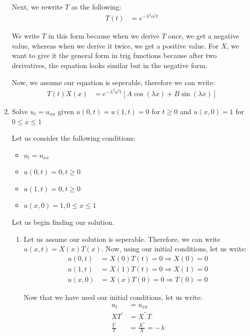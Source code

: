 \documentclass{article}
\begin{document}
\begin{enumerate}
Next, we rewrite $T$ as the following:
%
\begin{align}
  T(t) & = e^{-\lambda^2 \alpha^2 t}
\end{align}

We write $T$ in this form because when we derive $T$ once, we get a negative value, whereas when we derive it twice, we get a positive value. For $X$, we want to give it the general form in trig functions because after two derivatives, the equation looks similar but in the negative form.

Now, we assume our equation is seperable, therefore we can write:
%
\begin{align}
  T(t)X(x) & = e^{-\lambda^2 \alpha^2 t}[A \cos(\lambda x) + B \sin(\lambda x)]
\end{align}

%
%
\bigbreak
\setcounter{equation}{0}
%
%
  \item Solve $u_t = u_{xx}$ given $u(0, t) = u(1, t) = 0$ for $t \geq 0$ and $u(x, 0) = 1$ for $0 \leq x \leq 1$
%
%

Let us consider the following conditions:
%
\begin{itemize}
  \item $u_t = u_{xx}$
  \item $u(0, t) = 0, t \geq 0$
  \item $u(1, t) = 0, t \geq 0$
  \item $u(x, 0) = 1, 0 \leq x \leq 1$
\end{itemize}

Let us begin finding our solution.
\begin{enumerate}
  \item Let us assume our solution is seperable. Therefore, we can write $u(x, t) = X(x)T(x)$. Now, using our initial conditions, let us write:
  \begin{align}
    u(0, t) & = X(0)T(t) = 0 \Rightarrow X(0) = 0\\
    u(1, t) & = X(1)T(t) = 0 \Rightarrow X(1) = 0\\
    u(x, 0) & = X(x)T(0) = 0 \Rightarrow T(0) = 0
  \end{align}

  Now that we have used our initial conditions, let us write:
  \begin{align}
    u_t & = u_{xx}\\
    XT^\prime & = X^{\prime\prime}T\\
    \frac{T^\prime}{T} & = \frac{X^{\prime\prime}}{X} = -\lambda
  \end{align}


\end{enumerate}
\end{enumerate}
\end{document}

